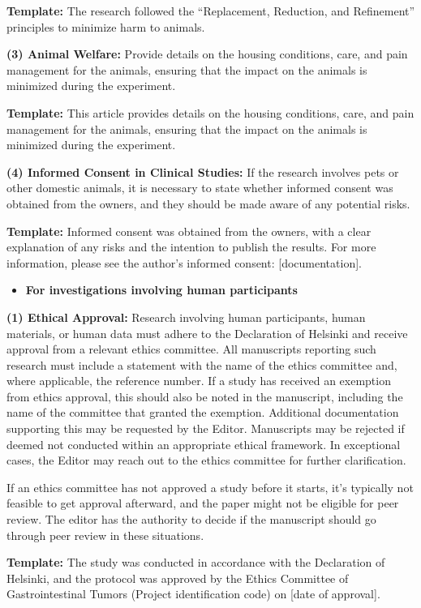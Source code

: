 \documentclass[12pt,a4paper]{article}
\begin{document}
\textbf{Template:} The research followed the ``Replacement, Reduction, and Refinement'' principles to minimize harm to animals.

\textbf{(3) Animal Welfare:} Provide details on the housing conditions, care, and pain management for the animals, ensuring that the impact on the animals is minimized during the experiment.

\textbf{Template:} This article provides details on the housing conditions, care, and pain management for the animals, ensuring that the impact on the animals is minimized during the experiment.

\textbf{(4) Informed Consent in Clinical Studies:} If the research involves pets or other domestic animals, it is necessary to state whether informed consent was obtained from the owners, and they should be made aware of any potential risks.

\textbf{Template:} Informed consent was obtained from the owners, with a clear explanation of any risks and the intention to publish the results. For more information, please see the author’s informed consent: [documentation].

\begin{itemize}
    \item \textbf{For investigations involving human participants}
\end{itemize}

\textbf{(1) Ethical Approval:} Research involving human participants, human materials, or human data must adhere to the Declaration of Helsinki and receive approval from a relevant ethics committee. All manuscripts reporting such research must include a statement with the name of the ethics committee and, where applicable, the reference number. If a study has received an exemption from ethics approval, this should also be noted in the manuscript, including the name of the committee that granted the exemption. Additional documentation supporting this may be requested by the Editor. Manuscripts may be rejected if deemed not conducted within an appropriate ethical framework. In exceptional cases, the Editor may reach out to the ethics committee for further clarification.

If an ethics committee has not approved a study before it starts, it’s typically not feasible to get approval afterward, and the paper might not be eligible for peer review. The editor has the authority to decide if the manuscript should go through peer review in these situations.

\textbf{Template:} The study was conducted in accordance with the Declaration of Helsinki, and the protocol was approved by the Ethics Committee of Gastrointestinal Tumors (Project identification code) on [date of approval].
\end{document}

